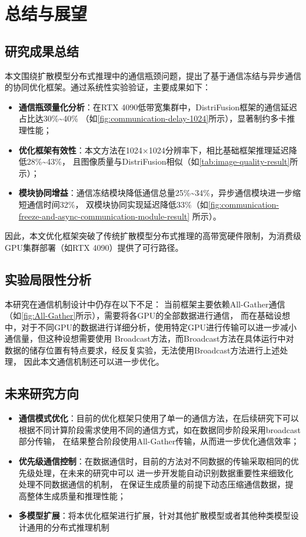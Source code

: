 \section{总结与展望}
\subsection{研究成果总结}
本文围绕扩散模型分布式推理中的通信瓶颈问题，提出了基于通信冻结与异步通信的协同优化框架。通过系统性实验验证，主要成果如下：
\begin{itemize}
    \item \textbf{通信瓶颈量化分析}：在RTX 4090低带宽集群中，DistriFusion框架的通信延迟占比达30\%\~{}40\%
    （如\autoref{fig:communication-delay-1024}所示），显著制约多卡推理性能；
    \item \textbf{优化框架有效性}：本文方法在1024×1024分辨率下，相比基础框架推理延迟降低28\%\~{}43\%，
    且图像质量与DistriFusion相似（如\autoref{tab:image-quality-result}所示）；
    \item \textbf{模块协同增益}：通信冻结模块降低通信总量25\%\~{}34\%，异步通信模块进一步缩短通信时间32\%，
    双模块协同实现延迟降低33\%（如\autoref{fig:communication-freeze-and-async-communication-module-result}
    所示）。
\end{itemize}
因此，本文优化框架突破了传统扩散模型分布式推理的高带宽硬件限制，为消费级GPU集群部署（如RTX 4090）提供了可行路径。

\subsection{实验局限性分析}
本研究在通信机制设计中仍存在以下不足：
当前框架主要依赖All-Gather通信（如\autoref{fig:All-Gather}所示），需要将各GPU的全部数据进行通信，
而在基础设想中，对于不同GPU的数据进行详细分析，使用特定GPU进行传输可以进一步减小通信量，但这种设想需要使用
Broadcast方法，而Broadcast方法在具体运行中对数据的储存位置有特点要求，经反复实验，无法使用Broadcast方法进行上述处理，
因此本文通信机制还可以进一步优化\cite{PytorchDistributedDataParallel}。
   

\subsection{未来研究方向}
\begin{itemize}
    \item \textbf{通信模式优化}：目前的优化框架只使用了单一的通信方法，在后续研究下可以
    根据不同计算阶段需求使用不同的通信方式，如在数据同步阶段采用broadcast部分传输，
    在结果整合阶段使用All-Gather传输，从而进一步优化通信效率；
    \item \textbf{优先级通信控制}：在数据通信时，目前的方法对不同数据的传输采取相同的优先级处理，在未来的研究中可以
    进一步开发能自动识别数据重要性来细致化处理不同数据通信的机制，
    在保证生成质量的前提下动态压缩通信数据，提高整体生成质量和推理性能\cite{Ouyang2020CommunicationOS}；
    \item \textbf{多模型扩展}：将本优化框架进行扩展，针对其他扩散模型或者其他种类模型设计通用的分布式推理机制
    
\end{itemize}

